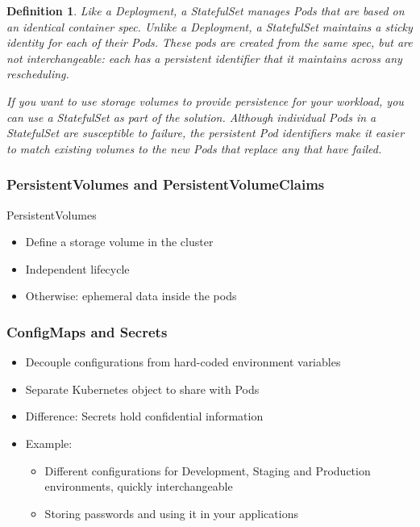 \documentclass{article}
\newtheorem{theorem}{Definition}[section]
\begin{document}
\begin{theorem}
    Like a Deployment, a StatefulSet manages Pods that are based on an identical container spec. 
    Unlike a Deployment, a StatefulSet maintains a sticky identity for each of their Pods. 
    These pods are created from the same spec, but are not interchangeable: 
    each has a persistent identifier that it maintains across any rescheduling.

    If you want to use storage volumes to provide persistence for your workload, 
    you can use a StatefulSet as part of the solution. 
    Although individual Pods in a StatefulSet are susceptible to failure, 
    the persistent Pod identifiers make it easier to match existing volumes to the new Pods that replace any that have failed.
\end{theorem}


\subsubsection{PersistentVolumes and PersistentVolumeClaims}

PersistentVolumes

\begin{itemize}
    \item Define a storage volume in the cluster
    \item Independent lifecycle
    \item Otherwise: ephemeral data inside the pods
\end{itemize}

\subsubsection{ConfigMaps and Secrets}

\begin{itemize}
    \item Decouple configurations from hard-coded environment variables
    \item Separate Kubernetes object to share with Pods
    \item Difference: Secrets hold confidential information
    \item Example:
    \begin{itemize}
        \item Different configurations for Development, Staging and Production environments, quickly interchangeable
        \item Storing passwords and using it in your applications
    \end{itemize}
\end{itemize}
\end{document}
